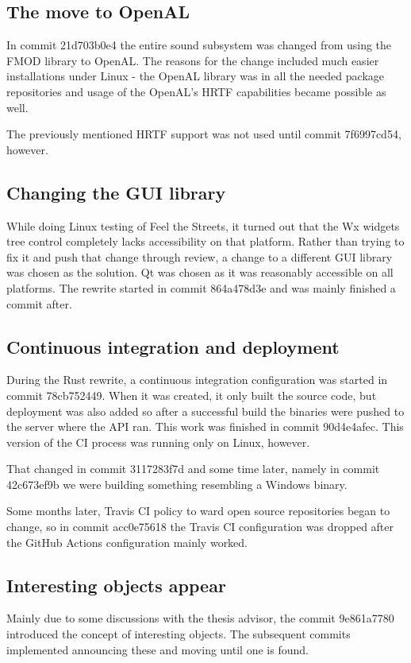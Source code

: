 \documentclass[nolof,digital]{fithesis3}
\begin{document}
\subsection{The move to OpenAL}
In commit 21d703b0e4 the entire sound subsystem was changed from using the FMOD library \parencite{fmod} to OpenAL. The reasons for the change included much easier installations under Linux - the OpenAL library was in all the needed package repositories and usage of the OpenAL's HRTF capabilities became possible as well.

The previously mentioned HRTF support was not used until commit 7f6997cd54, however.
\subsection{Changing the GUI library}
While doing Linux testing of Feel the Streets, it turned out that the Wx widgets tree control completely lacks accessibility on that platform. Rather than trying to fix it and push that change through review, a change to a different GUI library was chosen as the solution. Qt was chosen as it was reasonably accessible on all platforms. The rewrite started in commit 864a478d3e and was mainly finished a commit after.
\subsection{Continuous integration and deployment}
During the Rust rewrite, a continuous integration configuration was started in commit 78cb752449. When it was created, it only built the source code, but deployment was also added so after a successful build the binaries were pushed to the server where the API ran. This work was finished in commit 90d4e4afec. This version of the CI process was running only on Linux, however.

That changed in commit 3117283f7d and some time later, namely in commit 42c673ef9b we were building something resembling a Windows binary.

Some months later, Travis CI policy to ward open source repositories began to change, so in commit acc0e75618 the Travis CI configuration was dropped after the GitHub Actions configuration mainly worked.
\subsection{Interesting objects appear}
Mainly due to some discussions with the thesis advisor, the commit 9e861a7780 introduced the concept of interesting objects. The subsequent commits implemented announcing these and moving until one is found.
\end{document}
